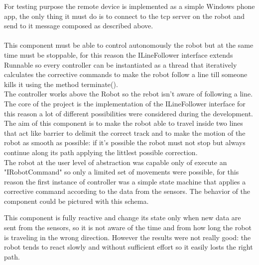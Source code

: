 \documentclass{llncs}
\begin{document}
For testing purpose the remote device is implemented as a simple Windows phone app, the only thing it must do is to connect to the tcp server on the robot and send to it message composed as described above.\\

\newpage
{}\\
This component must be able to control autonomously the robot but at the same time must be stoppable, for this reason the ILineFollower interface extends Runnable so every controller can be instantiated as a thread that iteratively calculates the corrective commands to make the robot follow a line till someone kills it using the method terminate().\\ 
The controller works above the Robot so the rebot isn't aware of following a line.\\
The core of the project is the implementation of the ILineFollower interface for this reason a lot of different possibilities were considered during the development. The aim of this component is to make the robot able to travel inside two lines that act like barrier to delimit the correct track and to make the motion of the robot as smooth as possible: if it's possible the robot must not stop but always continue along its path applying the littlest possible correction.\\
The robot at the user level of abstraction was capable only of execute an "IRobotCommand" so only a limited set of movements were possible, for this reason the first instance of controller was a simple state machine that applies a corrective command according to the data from the sensors. The behavior of the component could be pictured with this schema.
\begin{center}
\end{center}
\noindent This component is fully reactive and change its state only when new data are sent from the sensors, so it is not aware of the time and from how long the robot is traveling in the wrong direction. However the results were not really good: the robot tends to react slowly and without sufficient effort so it easily losts the right path.
\end{document}
